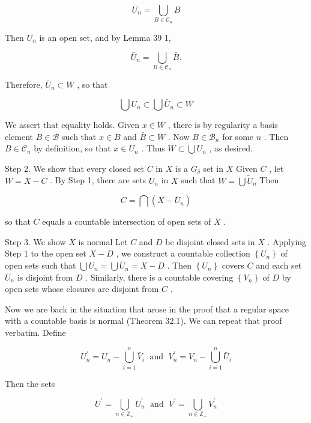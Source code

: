 \documentclass[10pt]{article}
\begin{document}
\[
{U}_{n} = \mathop{\bigcup }\limits_{{B \in  {\mathcal{C}}_{n}}}B
\]

Then \({U}_{n}\) is an open set, and by Lemma 39 1,

\[
{\bar{U}}_{n} = \mathop{\bigcup }\limits_{{B \in  {\mathcal{C}}_{n}}}\bar{B}.
\]

Therefore, \({\bar{U}}_{n} \subset  W\) , so that

\[
\bigcup {U}_{n} \subset  \bigcup {\bar{U}}_{n} \subset  W
\]

We assert that equality holds. Given \(x \in  W\) , there is by regularity a basis element \(B \in  \mathcal{B}\) such that \(x \in  B\) and \(\bar{B} \subset  W\) . Now \(B \in  {\mathcal{B}}_{n}\) for some \(n\) . Then \(B \in  {\mathcal{C}}_{n}\) by definition, so that \(x \in  {U}_{n}\) . Thus \(W \subset  \bigcup {U}_{n}\) , as desired.

Step 2. We show that every closed set \(C\) in \(X\) is a \({G}_{\delta }\) set in \(X\) Given \(C\) , let \(W = X - C\) . By Step 1, there are sets \({U}_{n}\) in \(X\) such that \(W = \bigcup {\widetilde{U}}_{n}\) Then

\[
C = \bigcap \left( {X - {\bar{U}}_{n}}\right)
\]

so that \(C\) equals a countable intersection of open sets of \(X\) .

Step 3. We show \(X\) is normal Let \(C\) and \(D\) be disjoint closed sets in \(X\) . Applying Step 1 to the open set \(X - D\) , we construct a countable collection \(\left\{  {U}_{n}\right\}\) of open sets such that \(\bigcup {U}_{n} = \bigcup {\bar{U}}_{n} = X - D\) . Then \(\left\{  {U}_{n}\right\}\) covers \(C\) and each set \({\bar{U}}_{n}\) is disjoint from \(D\) . Similarly, there is a countable covering \(\left\{  {V}_{n}\right\}\) of \(D\) by open sets whose closures are disjoint from \(C\) .

Now we are back in the situation that arose in the proof that a regular space with a countable basis is normal (Theorem 32.1). We can repeat that proof verbatim. Define

\[
{U}_{n}^{\prime } = {U}_{n} - \mathop{\bigcup }\limits_{{i = 1}}^{n}{\bar{V}}_{i}\;\text{ and }\;{V}_{n}^{\prime } = {V}_{n} - \mathop{\bigcup }\limits_{{i = 1}}^{n}{\bar{U}}_{i}
\]

Then the sets

\[
{U}^{\prime } = \mathop{\bigcup }\limits_{{n \in  {\mathbb{Z}}_{ + }}}{U}_{n}^{\prime }\;\text{ and }\;{V}^{\prime } = \mathop{\bigcup }\limits_{{n \in  {\mathbb{Z}}_{ + }}}{V}_{n}^{\prime }
\]
\end{document}
